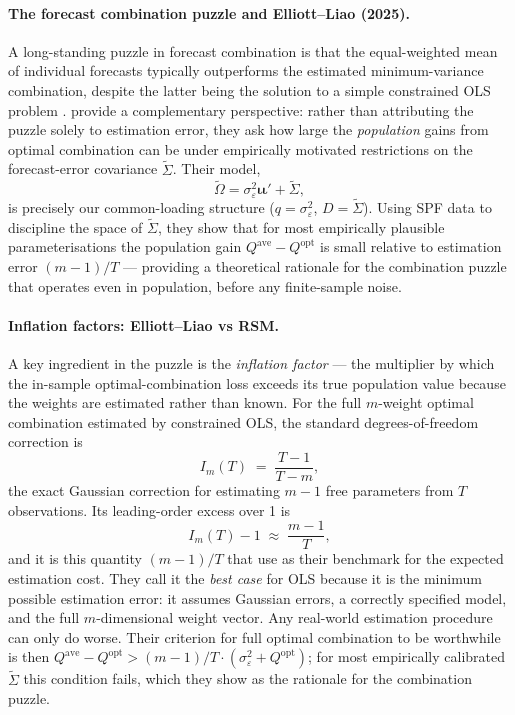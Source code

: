 \documentclass[12pt,a4paper]{article}
\theoremstyle{definition}
\newcommand{\Qopt}{Q^{\mathrm{opt}}}
\newcommand{\Qave}{Q^{\mathrm{ave}}}
\begin{document}
\paragraph{The forecast combination puzzle and Elliott--Liao (2025).}
A long-standing puzzle in forecast combination is that the equal-weighted
mean of individual forecasts typically outperforms the estimated
minimum-variance combination, despite the latter being the solution to a
simple constrained OLS problem \citep{BatesGranger1969,GrangerRamanathan1984}.
\citet{ElliottLiao2025} provide a complementary perspective: rather than
attributing the puzzle solely to estimation error, they ask how large the
\emph{population} gains from optimal combination can be under empirically
motivated restrictions on the forecast-error covariance $\tilde\Sigma$.
Their model,
\begin{equation}\label{eq:EL_model}
  \tilde\Omega = \sigma_\varepsilon^2\bm{\iota}\bm{\iota}' + \tilde\Sigma,
\end{equation}
is precisely our common-loading structure ($q=\sigma_\varepsilon^2$,
$D=\tilde\Sigma$).  Using SPF data to discipline the space of $\tilde\Sigma$,
they show that for most empirically plausible parameterisations the population
gain $\Qave-\Qopt$ is small relative to estimation error $(m-1)/T$ ---
providing a theoretical rationale for the combination puzzle that operates
even in population, before any finite-sample noise.

\paragraph{Inflation factors: Elliott--Liao vs RSM.}
A key ingredient in the puzzle is the \emph{inflation factor} --- the
multiplier by which the in-sample optimal-combination loss exceeds its
true population value because the weights are estimated rather than known.
For the full $m$-weight optimal combination estimated by constrained OLS,
the standard degrees-of-freedom correction is
\begin{equation}\label{eq:EL_inflation}
  I_m(T) \;=\; \frac{T-1}{T-m},
\end{equation}
the exact Gaussian correction for estimating $m-1$ free parameters from
$T$ observations.  Its leading-order excess over 1 is
\begin{equation}\label{eq:EL_excess}
  I_m(T)-1 \;\approx\; \frac{m-1}{T},
\end{equation}
and it is this quantity $(m-1)/T$ that \citet{ElliottLiao2025} use as
their benchmark for the expected estimation cost.  They call it the
\emph{best case} for OLS because it is the minimum possible estimation
error: it assumes Gaussian errors, a correctly specified model, and the
full $m$-dimensional weight vector.  Any real-world estimation procedure
can only do worse.  Their criterion for full optimal combination to be
worthwhile is then $\Qave-\Qopt > (m-1)/T\cdot(\sigma_\varepsilon^2+\Qopt)$;
for most empirically calibrated $\tilde\Sigma$ this condition fails, which
they show as the rationale for the combination puzzle.
\end{document}
